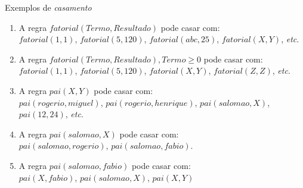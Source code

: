 
\begin{frame}[fragile]
    
    \begin{block}{Exemplos de \textit{casamento}}
    	
        \begin{enumerate}
        	\item A regra $fatorial(Termo, Resultado)$ pode casar com:\\
            $fatorial(1,1)$, $fatorial(5,120)$, $fatorial(abc,25)$, $fatorial(X,Y)$, \emph{etc}.
            
            \pause
             \item A regra $fatorial(Termo, Resultado), Termo \geq 0$ pode casar com:\\
            $fatorial(1,1)$, $fatorial(5,120)$, $fatorial(X,Y)$, $fatorial(Z,Z)$, \emph{etc}.
            
            \pause
            \item A regra $pai(X,Y)$ pode casar com:\\
            $pai(rogerio, miguel)$, $pai(rogerio, henrique)$, $pai(salomao, X)$, $pai(12,24)$, \emph{etc}.
            
            \pause
            \item A regra $pai(salomao, X)$ pode casar com:\\
            $pai(salomao, rogerio)$, $pai(salomao, fabio)$.
            
            \pause
            \item A regra $pai(salomao, fabio)$ pode casar com:\\
            $pai(X, fabio)$, $pai(salomao, X)$, $pai(X,Y)$
        \end{enumerate}
        
    \end{block}
    
\end{frame}


